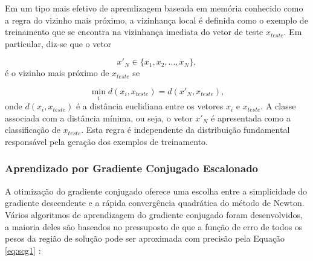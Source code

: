 Em um tipo mais efetivo de aprendizagem baseada em memória conhecido como a regra do vizinho mais próximo, a vizinhança local é definida como o exemplo de treinamento que se encontra na vizinhança imediata do vetor de teste $x_{teste}$. Em particular, diz-se que o vetor

\begin{equation}
\label{eq:nearestneighborhood_vector}
x'_N \in \{x_1, x_2, ..., x_N\},
\end{equation}
é o vizinho mais próximo de $x_{teste}$ se 

\begin{equation}
\label{eq:nearestneighborhood}
\min_i d(x_i, x_{teste}) = d(x'_N,x_{teste}),
\end{equation}
onde $d(x_i, x_{teste})$ \label{symbol:distanciaeuclidiana} é a distância euclidiana entre os vetores $x_i$ e $x_{teste}$. A classe associada com a distância mínima, ou seja, o vetor $x'_N$ é apresentada como a classificação de $x_{teste}$. Esta regra é independente da distribuição fundamental responsável pela geração dos exemplos de treinamento.

\subsubsection{Aprendizado por Gradiente Conjugado Escalonado}

A otimização do gradiente conjugado oferece uma escolha entre a simplicidade do gradiente descendente e a rápida convergência quadrática do método de Newton. Vários algoritmos de aprendizagem do gradiente conjugado foram desenvolvidos, a maioria deles são baseados no pressuposto de que a função de erro de todos os pesos da região de solução \label{symbol:errogcs} pode ser aproximada com precisão pela Equação \ref{eq:scg1} \cite{engelbrecht2007computational}:

